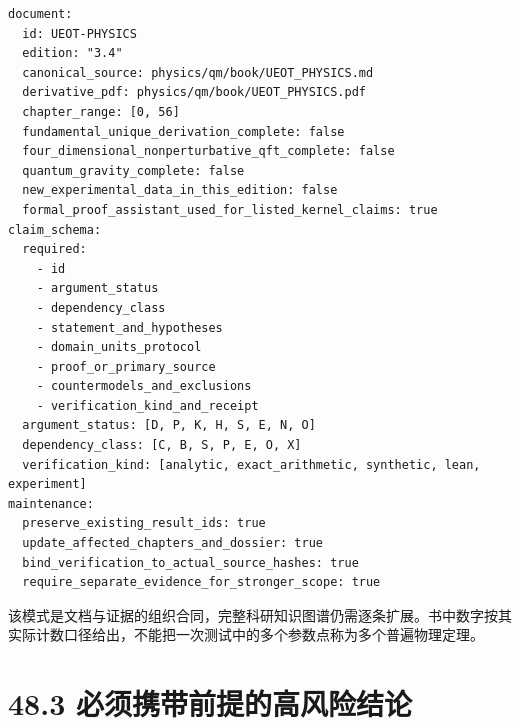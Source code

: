 \documentclass[
  11pt,
  oneside]{book}
\begin{document}
\begin{Verbatim}[breaklines,breakanywhere,fontsize=\scriptsize]
document:
  id: UEOT-PHYSICS
  edition: "3.4"
  canonical_source: physics/qm/book/UEOT_PHYSICS.md
  derivative_pdf: physics/qm/book/UEOT_PHYSICS.pdf
  chapter_range: [0, 56]
  fundamental_unique_derivation_complete: false
  four_dimensional_nonperturbative_qft_complete: false
  quantum_gravity_complete: false
  new_experimental_data_in_this_edition: false
  formal_proof_assistant_used_for_listed_kernel_claims: true
claim_schema:
  required:
    - id
    - argument_status
    - dependency_class
    - statement_and_hypotheses
    - domain_units_protocol
    - proof_or_primary_source
    - countermodels_and_exclusions
    - verification_kind_and_receipt
  argument_status: [D, P, K, H, S, E, N, O]
  dependency_class: [C, B, S, P, E, O, X]
  verification_kind: [analytic, exact_arithmetic, synthetic, lean, experiment]
maintenance:
  preserve_existing_result_ids: true
  update_affected_chapters_and_dossier: true
  bind_verification_to_actual_source_hashes: true
  require_separate_evidence_for_stronger_scope: true
\end{Verbatim}

该模式是文档与证据的组织合同，完整科研知识图谱仍需逐条扩展。书中数字按其实际计数口径给出，不能把一次测试中的多个参数点称为多个普遍物理定理。

\hypertarget{ux5fc5ux987bux643aux5e26ux524dux63d0ux7684ux9ad8ux98ceux9669ux7ed3ux8bba}{%
\section{48.3
必须携带前提的高风险结论}\label{ux5fc5ux987bux643aux5e26ux524dux63d0ux7684ux9ad8ux98ceux9669ux7ed3ux8bba}}
\end{document}
